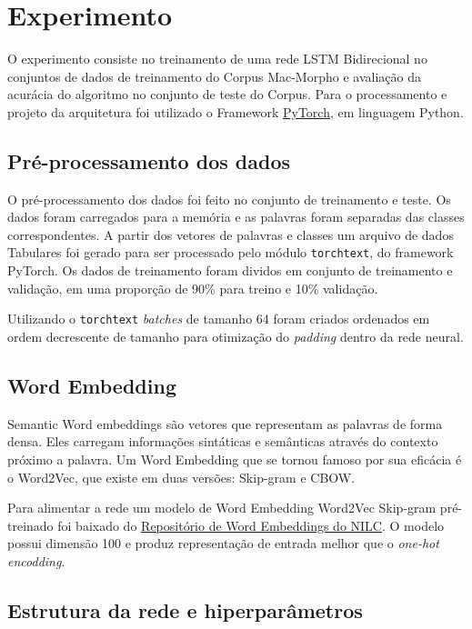 \documentclass[11pt]{scrartcl} %
\begin{document}
\section{Experimento}

O experimento consiste no treinamento de uma rede LSTM Bidirecional no conjuntos de dados de treinamento do Corpus Mac-Morpho e avaliação da acurácia do algoritmo no conjunto de teste do Corpus. Para o processamento e projeto da arquitetura foi utilizado o Framework \href{https://pytorch.org/}{PyTorch}, em linguagem Python.

\subsection{Pré-processamento dos dados}\label{sec:preproc}

O pré-processamento dos dados foi feito no conjunto de treinamento e teste. Os dados foram carregados para a memória e as palavras foram separadas das classes correspondentes. A partir dos vetores de palavras e classes um arquivo de dados Tabulares foi gerado para ser processado pelo módulo \texttt{torchtext}, do framework PyTorch. Os dados de treinamento foram dividos em conjunto de treinamento e validação, em uma proporção de 90\% para treino e 10\% validação. 

Utilizando o \texttt{torchtext} \textit{batches} de tamanho 64 foram criados ordenados em ordem decrescente de tamanho para otimização do \textit{padding} dentro da rede neural.


\subsection{Word Embedding}

Semantic Word embeddings são vetores que representam as palavras de forma densa. Eles carregam informações sintáticas e semânticas através do contexto próximo a palavra. Um Word Embedding que se tornou famoso por sua eficácia é o Word2Vec, que existe em duas versões: Skip-gram e CBOW.

Para alimentar a rede um modelo de Word Embedding Word2Vec Skip-gram pré-treinado foi baixado do \href{http://nilc.icmc.usp.br/embeddings}{Repositório de Word Embeddings do NILC}. O modelo possui dimensão 100 e produz representação de entrada melhor que o \textit{one-hot encodding}.

\subsection{Estrutura da rede e hiperparâmetros}
\end{document}
